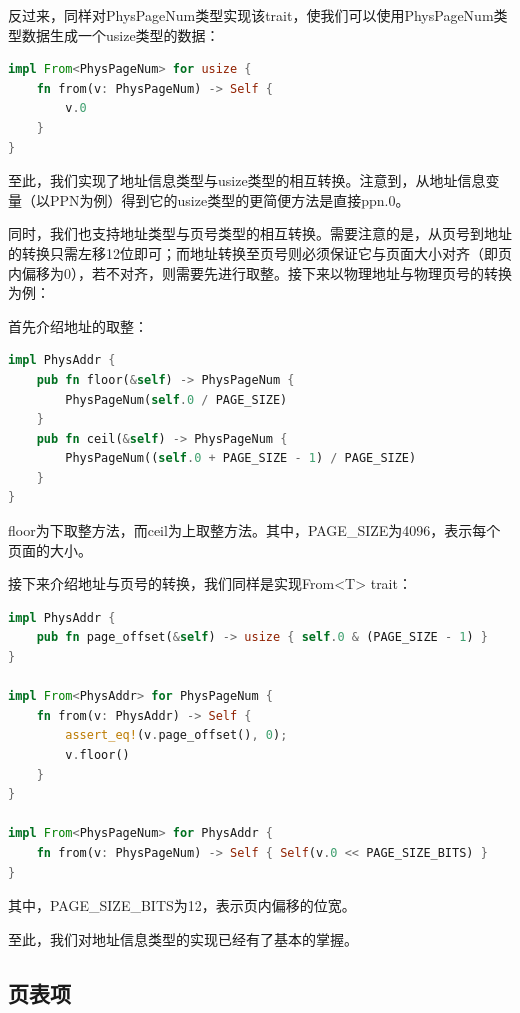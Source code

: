 反过来，同样对PhysPageNum类型实现该trait，使我们可以使用PhysPageNum类型数据生成一个usize类型的数据：

\begin{lstlisting}[language={Rust}, label={code:address},
	caption={os/src/mm/address.rs}]
impl From<PhysPageNum> for usize {
	fn from(v: PhysPageNum) -> Self {
		v.0
	}
}
\end{lstlisting}

至此，我们实现了地址信息类型与usize类型的相互转换。注意到，从地址信息变量（以PPN为例）得到它的usize类型的更简便方法是直接ppn.0。

同时，我们也支持地址类型与页号类型的相互转换。需要注意的是，从页号到地址的转换只需左移12位即可；而地址转换至页号则必须保证它与页面大小对齐（即页内偏移为0），若不对齐，则需要先进行取整。接下来以物理地址与物理页号的转换为例：

首先介绍地址的取整：

\begin{lstlisting}[language={Rust}, label={code:address},
	caption={os/src/mm/address.rs}]
impl PhysAddr {
	pub fn floor(&self) -> PhysPageNum {
		PhysPageNum(self.0 / PAGE_SIZE)
	}
	pub fn ceil(&self) -> PhysPageNum {
		PhysPageNum((self.0 + PAGE_SIZE - 1) / PAGE_SIZE)
	}
}
\end{lstlisting}

floor为下取整方法，而ceil为上取整方法。其中，PAGE\_SIZE为4096，表示每个页面的大小。

接下来介绍地址与页号的转换，我们同样是实现From<T> trait：

\begin{lstlisting}[language={Rust}, label={code:address},
	caption={os/src/mm/address.rs}]
impl PhysAddr {
	pub fn page_offset(&self) -> usize { self.0 & (PAGE_SIZE - 1) }
}

impl From<PhysAddr> for PhysPageNum {
	fn from(v: PhysAddr) -> Self {
		assert_eq!(v.page_offset(), 0);
		v.floor()
	}
}

impl From<PhysPageNum> for PhysAddr {
	fn from(v: PhysPageNum) -> Self { Self(v.0 << PAGE_SIZE_BITS) }
}
\end{lstlisting}

其中，PAGE\_SIZE\_BITS为12，表示页内偏移的位宽。

至此，我们对地址信息类型的实现已经有了基本的掌握。

\subsection{页表项}

